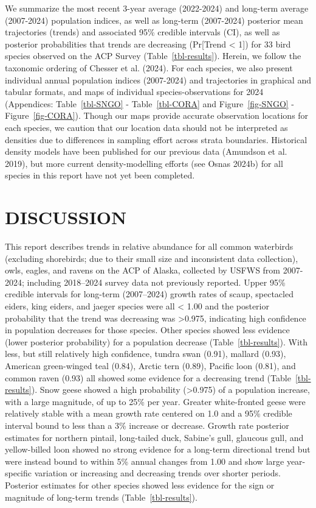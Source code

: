 \documentclass[
]{article}
\begin{document}
We summarize the most recent 3-year average (2022-2024) and long-term
average (2007-2024) population indices, as well as long-term (2007-2024)
posterior mean trajectories (trends) and associated 95\% credible
intervals (CI), as well as posterior probabilities that trends are
decreasing (Pr{[}Trend \textless{} 1{]}) for 33 bird species observed on
the ACP Survey (Table~\ref{tbl-results}). Herein, we follow the
taxonomic ordering of Chesser et al. (2024). For each species, we also
present individual annual population indices (2007-2024) and
trajectories in graphical and tabular formats, and maps of individual
species-observations for 2024 (Appendices: Table~\ref{tbl-SNGO} -
Table~\ref{tbl-CORA} and Figure~\ref{fig-SNGO} - Figure~\ref{fig-CORA}).
Though our maps provide accurate observation locations for each species,
we caution that our location data should not be interpreted as densities
due to differences in sampling effort across strata boundaries.
Historical density models have been published for our previous data
(Amundson et al. 2019), but more current density-modelling efforts (see
Osnas 2024b) for all species in this report have not yet been completed.

\section*{DISCUSSION}\label{discussion}

This report describes trends in relative abundance for all common
waterbirds (excluding shorebirds; due to their small size and
inconsistent data collection), owls, eagles, and ravens on the ACP of
Alaska, collected by USFWS from 2007-2024; including 2018--2024 survey
data not previously reported. Upper 95\% credible intervals for
long-term (2007--2024) growth rates of scaup, spectacled eiders, king
eiders, and jaeger species were all \textless{} 1.00 and the posterior
probability that the trend was decreasing was \textgreater0.975,
indicating high confidence in population decreases for those species.
Other species showed less evidence (lower posterior probability) for a
population decrease (Table~\ref{tbl-results}). With less, but still
relatively high confidence, tundra swan (0.91), mallard (0.93), American
green-winged teal (0.84), Arctic tern (0.89), Pacific loon (0.81), and
common raven (0.93) all showed some evidence for a decreasing trend
(Table~\ref{tbl-results}). Snow geese showed a high probability
(\textgreater0.975) of a population increase, with a large magnitude, of
up to 25\% per year. Greater white-fronted geese were relatively stable
with a mean growth rate centered on 1.0 and a 95\% credible interval
bound to less than a 3\% increase or decrease. Growth rate posterior
estimates for northern pintail, long-tailed duck, Sabine's gull,
glaucous gull, and yellow-billed loon showed no strong evidence for a
long-term directional trend but were instead bound to within 5\% annual
changes from 1.00 and show large year-specific variation or increasing
and decreasing trends over shorter periods. Posterior estimates for
other species showed less evidence for the sign or magnitude of
long-term trends (Table~\ref{tbl-results}).
\end{document}
